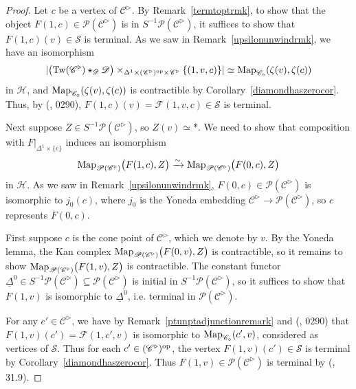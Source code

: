 \documentclass{tac}
\newcommand{\s}[1]{\mathscr{#1}}
\newcommand{\tx}[1]{\textnormal{#1}}
\newcommand{\ul}[1]{\underline{#1}}
\begin{document}
\begin{proof} Let $c$ be a vertex of $\s{C}^\triangleright$. By Remark~\ref{termtoptrmk}, to show that the object $F(1,c) \in \s{P}(\s{C}^\triangleright )$ is in $S^{-1} \s{P}(\s{C}^\triangleright)$, it suffices to show that $F(1,c)(v) \in \s{S}$ is terminal.  As we saw in Remark~\ref{upsilonunwindrmk}, we have an isomorphism 
\[ | \big( \tx{Tw}(\s{C}^\triangleright )\star_{\s{D}} \s{D} \big) \times_{\Delta^1 \times (\s{C}^\triangleright )^\tx{op} \times \s{C}^\triangleright } \{ (1,v,c) \} | \simeq \tx{Map}_{\s{C}_\diamond } (\zeta (v), \zeta (c)) \]
in $\s{H}$, and $\tx{Map}_{\s{C}_\diamond } (\zeta (v), \zeta (c))$ is contractible by Corollary~\ref{diamondhaszerocor}.  Thus, by (\cite{kerodon}, 0290), $F(1,c)(v) = \s{F}(1,v,c) \in \s{S}$ is terminal.

Next suppose $Z \in S^{-1} \s{P}(\s{C}^\triangleright )$, so $Z(v) \simeq *$.  We need to show that composition with $F|_{\Delta^1 \times \{ c\}}$ induces an isomorphism
\[ \tx{Map}_{\s{P}(\s{C}^\triangleright )} \big( F(1,c), Z \big)  \xrightarrow{\sim} \tx{Map}_{\s{P}(\s{C}^\triangleright )} \big(   F(0,c) , Z \big)   \]
in $\s{H}$.  As we saw in Remark~\ref{upsilonunwindrmk}, $F(0,c) \in \s{P}(\s{C}^\triangleright )$ is isomorphic to $j_0 (c)$, where $j_0$ is the Yoneda embedding $\s{C}^\triangleright  \to \s{P}(\s{C}^\triangleright )$, so $c$ represents $F(0,c)$.

\hfill

First suppose $c$ is the cone point of $\s{C}^\triangleright$, which we denote by $v$.  By the Yoneda lemma, the Kan complex $\tx{Map}_{\s{P}(\s{C}^\triangleright )} \big(   F(0,v) , Z \big)$ is contractible, so it remains to show $\tx{Map}_{\s{P}(\s{C}^\triangleright )} \big( F(1,v), Z \big)$ is contractible.  The constant functor $\ul{\Delta}^0 \in S^{-1} \s{P}(\s{C}^\triangleright ) \subseteq \s{P}(\s{C}^\triangleright )$ is initial in $ S^{-1} \s{P}(\s{C}^\triangleright )$, so it suffices to show that $F(1,v)$ is isomorphic to $\ul{\Delta}^0$, i.e. terminal in $\s{P}(\s{C}^\triangleright )$.  

For any $c' \in \s{C}^\triangleright$, we have by Remark~\ref{ptunptadjunctionremark} and (\cite{kerodon}, 0290) that $F(1,v)(c') = \s{F}(1,c' ,v)$ is isomorphic to $\tx{Map}_{\s{C}_\diamond} (c' ,v)$, considered as vertices of $\s{S}$.  Thus for each $c' \in (\s{C}^\triangleright )^\tx{op}$, the vertex $F(1,v)(c') \in \s{S}$ is terminal by Corollary~\ref{diamondhaszerocor}.  Thus $F(1,v) \in \s{P}(\s{C}^\triangleright )$ is terminal by (\cite{rezk}, 31.9).


\end{proof}
\end{document}
